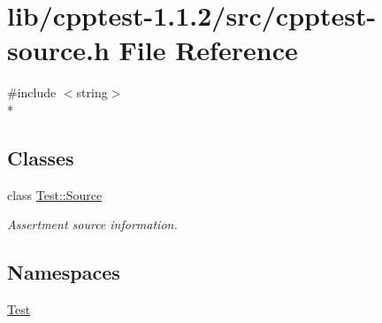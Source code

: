 \hypertarget{cpptest-source_8h}{}\section{lib/cpptest-\/1.1.2/src/cpptest-\/source.h File Reference}
\label{cpptest-source_8h}
{\ttfamily \#include $<$string$>$}\\*
\subsection*{Classes}
\begin{DoxyCompactItemize}
\item 
class \hyperlink{class_test_1_1_source}{Test\+::\+Source}
\begin{DoxyCompactList}\small\item\em Assertment source information. \end{DoxyCompactList}\end{DoxyCompactItemize}
\subsection*{Namespaces}
\begin{DoxyCompactItemize}
\item 
 \hyperlink{namespace_test}{Test}
\end{DoxyCompactItemize}

